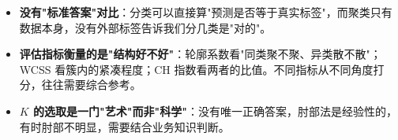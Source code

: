 \documentclass[a4paper,11pt]{ctexart}
\begin{document}
\begin{beginnerbox}
    \begin{itemize}
        \item \textbf{没有"标准答案"对比}：分类可以直接算"预测是否等于真实标签"，而聚类只有数据本身，没有外部标签告诉我们分几类是"对的"。
        \item \textbf{评估指标衡量的是"结构好不好"}：轮廓系数看"同类聚不聚、异类散不散"；WCSS 看簇内的紧凑程度；CH 指数看两者的比值。不同指标从不同角度打分，往往需要综合参考。
        \item \textbf{$K$ 的选取是一门"艺术"而非"科学"}：没有唯一正确答案，肘部法是经验性的，有时肘部不明显，需要结合业务知识判断。
    \end{itemize}
\end{beginnerbox}
\end{document}
